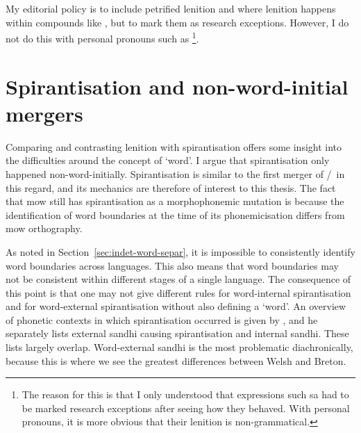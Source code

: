 My editorial policy is to include petrified lenition and where lenition happens within compounds like , but to mark them as research exceptions. However, I do not do this with personal pronouns such as \footnote{The reason for this is that I only understood that expressions such sa  had to be marked research exceptions after seeing how they behaved. With personal pronouns, it is more obvious that their lenition is non-grammatical.}.

\section{Spirantisation and non-word-initial mergers}
\label{sec:spirantization}

Comparing and contrasting lenition with spirantisation offers some insight into the difficulties around the concept of `word'. I argue that spirantisation only happened non-word-initially.
Spirantisation is similar to the first merger of \lT/\xD\ in this regard, and its mechanics are therefore of interest to this thesis.
The fact that \gls{mow} still has spirantisation as a morphophonemic mutation is because the identification of word boundaries at the time of its phonemicisation differs from \gls{mow} orthography.

As noted in Section~\ref{sec:indet-word-separ}, it is impossible to consistently identify word boundaries across languages.
This also means that word boundaries may not be consistent within different stages of a single language.
The consequence of this point is that one may not give different rules for word-internal spirantisation and for word-external spirantisation without also defining a `word'.
An overview of phonetic contexts in which spirantisation occurred is given by \textcite[2--3]{schrijver_spirantization_1999}, and he separately lists external sandhi causing spirantisation and internal sandhi.
These lists largely overlap.
Word-external sandhi is the most problematic diachronically, because this is where we see the greatest differences between Welsh and Breton.


